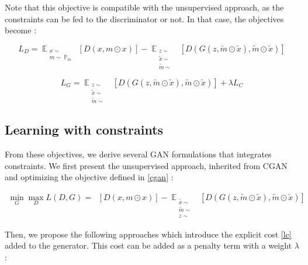 \documentclass{article}
\begin{document}
		Note that this objective is compatible with the unsupervised approach, as the constraints can be fed to the discriminator or not. In that case, the objectives become :
	
		\begin{equation}
		L_{D} =  \mathop{\mathbb{E}}_{\substack{
				x\sim \mathop{\mathbb{P}_r}\\	
				m \sim \mathop{\mathbb{P}}_{m}}}
		[D(x, m\odot x)] - \mathop{\mathbb{{E}}}_{\substack{
				z \sim \mathop{\mathbb{{P}}_{z}} \\
				\tilde{x} \sim \mathop{\mathbb{{P}}_{r}} \\
				\tilde{m} \sim \mathop{\mathbb{{P}}_{m} }
		}} [D(G(z, \tilde{m}\odot\tilde{x}), \tilde{m}\odot\tilde{x})] 
		\end{equation}
		
		
		\begin{equation}
		L_{G} =  \mathop{\mathbb{{E}}}_{\substack{
				z \sim \mathop{\mathbb{{P}}_{z}} \\
				\tilde{x} \sim \mathop{\mathbb{{P}}_{r}} \\
				\tilde{m} \sim \mathop{\mathbb{{P}}_{m} }
		}} [D(G(z, \tilde{m}\odot\tilde{x}), \tilde{m}\odot\tilde{x})]  + \lambda L_C
		\end{equation}
		
	
	\subsection{Learning with constraints}
	
		From these objectives, we derive several GAN formulations that integrates constraints. 	We first present the unsupervised approach, inherited from CGAN and optimizing the objective defined in \eqref{cgan} :
	
		\begin{align}
			\min_G \max_D  L(D, G) = \mathop{\mathbb{{E}}_{\substack{
						x \sim \mathop{\mathbb{{P}}_{r}} \\
						m \sim \mathop{\mathbb{{P}}_{m}}
			}}} [D(x, m\odot x)] 
			- \mathop{\mathbb{{E}}}_{\substack{
					\tilde{x} \sim \mathop{\mathbb{{P}}_{r}} \\
					\tilde{m} \sim \mathop{\mathbb{{P}}_{m} }\\
					z \sim \mathop{\mathbb{{P}}_{z} }
			}} [D(G(z, \tilde{m}\odot\tilde{x}), \tilde{m}\odot\tilde{x})] 
		\end{align}
		
		Then, we propose the following approaches which introduce the explicit cost \eqref{lc} added to the generator. This cost can be added as a penalty term with a weight $\lambda$ :
		
\end{document}
